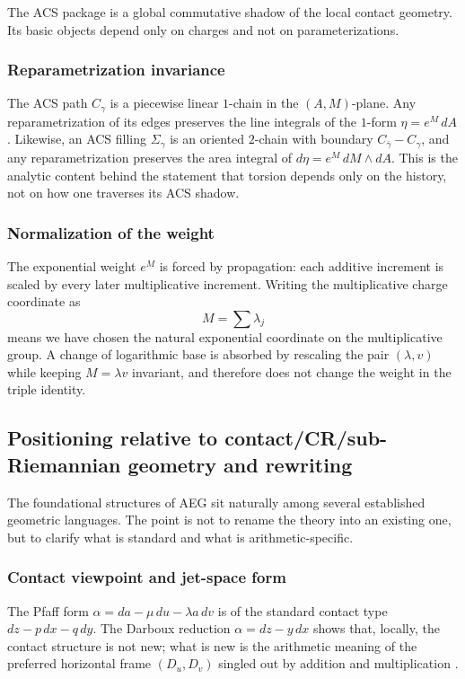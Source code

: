 The ACS package is a global commutative shadow of the local contact geometry. Its basic objects depend only on charges and not on parameterizations.

\subsubsection*{Reparametrization invariance}
The ACS path $C_\gamma$ is a piecewise linear $1$-chain in the $(A,M)$-plane. Any reparametrization of its edges preserves the line integrals of the $1$-form $\eta=e^M\,dA$. Likewise, an ACS filling $\Sigma_\gamma$ is an oriented $2$-chain with boundary $C_{\bar\gamma}-C_\gamma$, and any reparametrization preserves the area integral of $d\eta=e^M\,dM\wedge dA$. This is the analytic content behind the statement that torsion depends only on the history, not on how one traverses its ACS shadow.

\subsubsection*{Normalization of the weight}
The exponential weight $e^M$ is forced by propagation: each additive increment is scaled by every later multiplicative increment. Writing the multiplicative charge coordinate as
\[
M=\sum \lambda_j
\]
means we have chosen the natural exponential coordinate on the multiplicative group. A change of logarithmic base is absorbed by rescaling the pair $(\lambda,v)$ while keeping $M=\lambda v$ invariant, and therefore does not change the weight in the triple identity.

\subsection{Positioning relative to contact/CR/sub-Riemannian geometry and rewriting}\label{subsec:inv-positioning}

The foundational structures of AEG sit naturally among several established geometric languages. The point is not to rename the theory into an existing one, but to clarify what is standard and what is arithmetic-specific.

\subsubsection*{Contact viewpoint and jet-space form}
The Pfaff form $\alpha=da-\mu\,du-\lambda a\,dv$ is of the standard contact type $dz-p\,dx-q\,dy$. The Darboux reduction $\alpha=dz-y\,dx$ shows that, locally, the contact structure is not new; what is new is the arithmetic meaning of the preferred horizontal frame $(D_u,D_v)$ singled out by addition and multiplication \cite{Darboux1882Pfaff,Geiges2001BriefHistory,Geiges2008IntroContact}.

